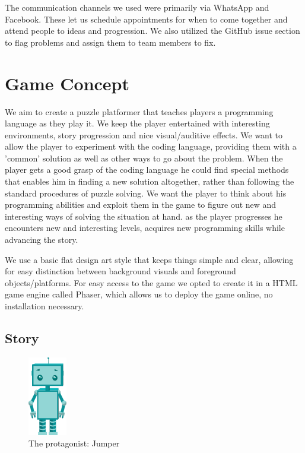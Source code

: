 \documentclass[a4paper,twoside,12pt]{article}
\begin{document}
The communication channels we used were primarily via WhatsApp and Facebook. These let us schedule appointments for when to come together and attend people to ideas and progression. We also utilized the GitHub issue section to flag problems and assign them to team members to fix.

\section{Game Concept}
We aim to create a puzzle platformer that teaches players a programming language as they play it. We keep the player entertained with interesting environments, story progression and nice visual/auditive effects. We want to allow the player to experiment with the coding language, providing them with a 'common' solution as well as other ways to go about the problem. When the player gets a good grasp of the coding language he could find special methods that enables him in finding a new solution altogether, rather than following the standard procedures of puzzle solving. We want the player to think about his programming abilities and exploit them in the game to figure out new and interesting ways of solving the situation at hand.
as the player progresses he encounters new and interesting levels, acquires new programming skills while advancing the story.

We use a basic flat design art style that keeps things simple and clear, allowing for easy distinction between background visuals and foreground objects/platforms. For easy access to the game we opted to create it in a HTML game engine called Phaser, which allows us to deploy the game online, no installation necessary.

\subsection{Story}

\begin{figure}[H]
\centering
\includegraphics[scale=1.5]{jumper}
\caption{The protagonist: Jumper}
\end{figure}
\end{document}
